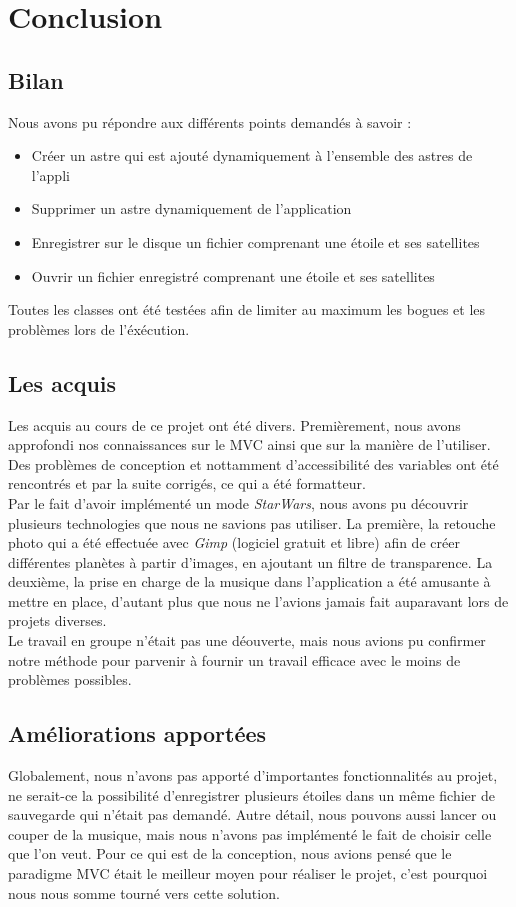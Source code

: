\documentclass[a4paper,10pt]{article}
\begin{document}
\newpage
\newpage
\section{Conclusion}
\subsection{Bilan}
Nous avons pu répondre aux différents points demandés à savoir :
\begin{itemize}
 \item Créer un astre qui est ajouté dynamiquement à l'ensemble des astres de l'appli
 \item Supprimer un astre dynamiquement de l'application
 \item Enregistrer sur le disque un fichier comprenant une étoile et ses satellites
 \item Ouvrir un fichier enregistré comprenant une étoile et ses satellites
\end{itemize}

Toutes les classes ont été testées afin de limiter au maximum les bogues et les problèmes lors de l'éxécution.


\subsection{Les acquis}
Les acquis au cours de ce projet ont été divers. Premièrement, nous avons approfondi nos connaissances sur le MVC ainsi que sur la manière de l'utiliser. Des problèmes de conception et nottamment d'accessibilité des variables ont été rencontrés et par la suite corrigés, ce qui a été formatteur.
\\

Par le fait d'avoir implémenté un mode \textit{StarWars}, nous avons pu découvrir plusieurs technologies que nous ne savions pas utiliser. La première, la retouche photo qui a été effectuée avec \textit{Gimp} (logiciel gratuit et libre) afin de créer différentes planètes à partir d'images, en ajoutant un filtre de transparence. La deuxième, la prise en charge de la musique dans l'application a été amusante à mettre en place, d'autant plus que nous ne l'avions jamais fait auparavant lors de projets diverses.
\\

Le travail en groupe n'était pas une déouverte, mais nous avions pu confirmer notre méthode pour parvenir à fournir un travail efficace avec le moins de problèmes possibles.

\subsection{Améliorations apportées}
Globalement, nous n'avons pas apporté d'importantes fonctionnalités au projet, ne serait-ce la possibilité d'enregistrer plusieurs étoiles dans un même fichier de sauvegarde qui n'était pas demandé. Autre détail, nous pouvons aussi lancer ou couper de la musique, mais nous n'avons pas implémenté le fait de choisir celle que l'on veut. Pour ce qui est de la conception, nous avions pensé que le paradigme MVC était le meilleur moyen pour réaliser le projet, c'est pourquoi nous nous somme tourné vers cette solution. 
\end{document}
